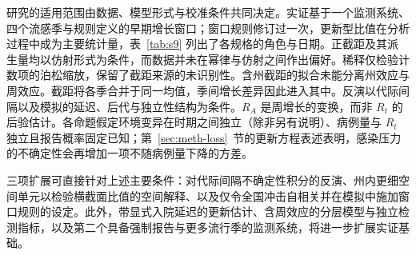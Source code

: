 研究的适用范围由数据、模型形式与校准条件共同决定。实证基于一个监测系统、四个流感季与规则定义的早期增长窗口；窗口规则修订过一次，更新型比值在分析过程中成为主要统计量，表~\ref{tab:s9} 列出了各规格的角色与日期。正截距及其派生量均以仿射形式为条件，而数据并未在幂律与仿射之间作出偏好。稀释仅检验计数项的泊松缩放，保留了截距来源的未识别性。含州截距的拟合未能分离州效应与周效应。截距将各季合并于同一均值，季间增长差异因此进入其中。反演以代际间隔以及模拟的延迟、后代与独立性结构为条件。$R_A$ 是周增长的变换，而非 $R_t$ 的后验估计\citep{cori2013new}。各命题假定环境变异在时期之间独立（除非另有说明）、病例量与 $R_t$ 独立且报告概率固定已知；第~\ref{sec:meth-loss}~节的更新方程表述表明，感染压力的不确定性会再增加一项不随病例量下降的方差。

三项扩展可直接针对上述主要条件：对代际间隔不确定性积分的反演、州内更细空间单元以检验横截面比值的空间解释、以及仅令全国冲击自相关并在模拟中施加窗口规则的设定。此外，带显式入院延迟的更新估计、含周效应的分层模型与独立检测指标，以及第二个具备强制报告与更多流行季的监测系统，将进一步扩展实证基础。
